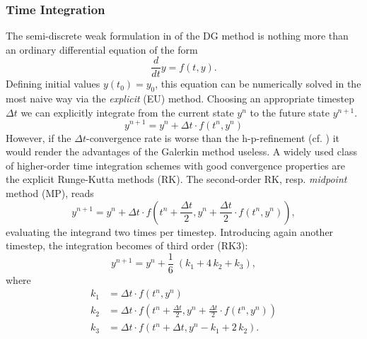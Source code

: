 \subsubsection{Time Integration}
\label{sec:time-integration}

The semi-discrete weak formulation in  of
the DG method is nothing more than an ordinary differential equation of the
form
\begin{equation}
\frac{d}{dt}y = f(t,y).
\end{equation}
Defining initial values $y(t_0) = y_0$, this equation can be numerically solved
in the most naive way via the \emph{explicit}  (EU) method. Choosing
an appropriate timestep $\Delta t$ we can explicitly integrate from the current
state $y^n$ to the future state $y^{n+1}$.
\begin{equation}
    y^{n+1} = y^{n} + \Delta t \cdot f(t^n,y^n)
\end{equation}
However, if the $\Delta t$-convergence rate is worse than the h-p-refinement
(cf. ) it would render the advantages of the Galerkin
method useless. A widely used class of higher-order time integration schemes
with good convergence properties are the explicit Runge-Kutta methods (RK). The
second-order RK, resp. \emph{midpoint} method (MP), reads
\begin{equation}
    y^{n+1} = y^{n} + \Delta t \cdot f\left(t^n + \frac{\Delta t}{2},y^n + \frac{\Delta t}{2} \cdot f(t^n,y^n)\right),
\end{equation}
evaluating the integrand two times per timestep. Introducing again another timestep,
the integration becomes of third order (RK3):
\begin{equation}
    y^{n+1} = y^{n} + \frac{1}{6}\;(k_1 + 4\,k_2 + k_3),
\end{equation}
where 
\begin{align}
    k_1 &= \Delta t \cdot f(t^n,y^n) \\[0.4cm]
    k_2 &= \Delta t \cdot f\left(t^n + \frac{\Delta t}{2},y^n + \frac{\Delta t}{2} \cdot f(t^n,y^n)\right) \\[0.4cm]
    k_3 &= \Delta t \cdot f\left(t^n + \Delta t,y^n - k_1 + 2\,k_2\right).
\end{align}

